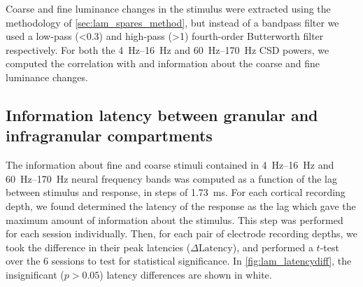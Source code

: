 Coarse and fine luminance changes in the stimulus were extracted using the methodology of \autoref{sec:lam_spares_method}, but instead of a bandpass filter we used a low-pass (\SI{<0.3}{\cpd}) and high-pass (\SI{>1}{\cpd}) fourth-order Butterworth filter respectively.
For both the \SIrange{4}{16}{Hz} and \SIrange{60}{170}{Hz} \ac{CSD} powers, we computed the correlation with and information about the coarse and fine luminance changes.


\subsection{Information latency between granular and infragranular compartments}
\label{sec:lam_latency_method}

The information about fine and coarse stimuli contained in \SIrange{4}{16}{Hz} and \SIrange{60}{170}{Hz} neural frequency bands was computed as a function of the lag between stimulus and response, in steps of \SI{1.73}{\milli\second}.
For each cortical recording depth, we found determined the latency of the response as the lag which gave the maximum amount of information about the stimulus.
This step was performed for each session individually.
%
Then, for each pair of electrode recording depths, we took the difference in their peak latencies ($\Delta\text{Latency}$), and performed a $t$-test over the \num{6} sessions to test for statistical significance.
In \autoref{fig:lam_latencydiff}, the insignificant ($p>0.05$) latency differences are shown in white.
%


